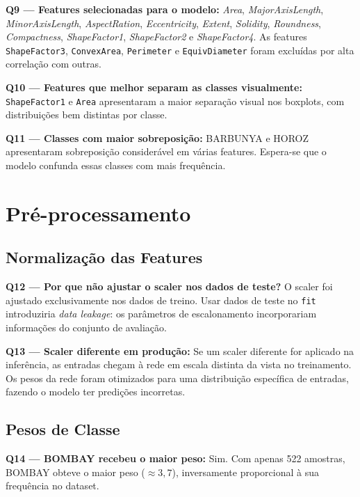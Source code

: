 \documentclass[12pt,a4paper]{article}
\begin{document}
\textbf{Q9 — Features selecionadas para o modelo:}
\textit{Area}, \textit{MajorAxisLength}, \textit{MinorAxisLength},
\textit{AspectRation}, \textit{Eccentricity}, \textit{Extent},
\textit{Solidity}, \textit{Roundness}, \textit{Compactness},
\textit{ShapeFactor1}, \textit{ShapeFactor2} e \textit{ShapeFactor4}.
As features \texttt{ShapeFactor3}, \texttt{ConvexArea}, \texttt{Perimeter}
e \texttt{EquivDiameter} foram excluídas por alta correlação com outras.

\textbf{Q10 — Features que melhor separam as classes visualmente:}
\texttt{ShapeFactor1} e \texttt{Area} apresentaram a maior separação visual
nos boxplots, com distribuições bem distintas por classe.

\textbf{Q11 — Classes com maior sobreposição:}
BARBUNYA e HOROZ apresentaram sobreposição considerável em várias features.
Espera-se que o modelo confunda essas classes com mais frequência.

\section{Pré-processamento}


\subsection{Normalização das Features}

\textbf{Q12 — Por que não ajustar o scaler nos dados de teste?}
O scaler foi ajustado exclusivamente nos dados de treino.  Usar dados de teste
no \texttt{fit} introduziria \textit{data leakage}: os parâmetros de
escalonamento incorporariam informações do conjunto de avaliação.

\textbf{Q13 — Scaler diferente em produção:}
Se um scaler diferente for aplicado na inferência, as entradas chegam à rede
em escala distinta da vista no treinamento.  Os pesos da rede foram otimizados
para uma distribuição específica de entradas, fazendo o modelo ter predições incorretas.

\subsection{Pesos de Classe}

\textbf{Q14 — BOMBAY recebeu o maior peso:}
Sim.  Com apenas 522 amostras, BOMBAY obteve o maior peso (\(\approx 3{,}7\)),
inversamente proporcional à sua frequência no dataset.
\end{document}
